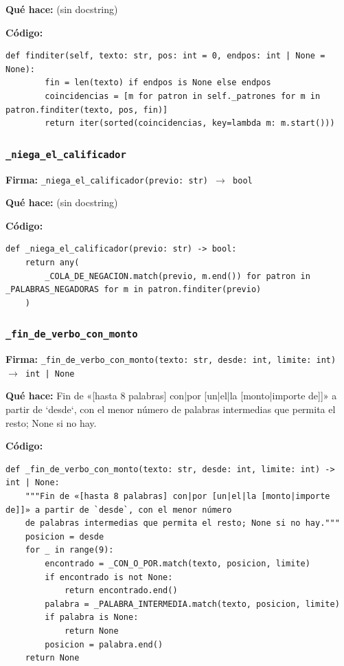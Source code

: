 \documentclass[11pt,a4paper]{article}
\begin{document}
\textbf{Qué hace:} (sin docstring)

\textbf{Código:}
\begin{lstlisting}
def finditer(self, texto: str, pos: int = 0, endpos: int | None = None):
        fin = len(texto) if endpos is None else endpos
        coincidencias = [m for patron in self._patrones for m in patron.finditer(texto, pos, fin)]
        return iter(sorted(coincidencias, key=lambda m: m.start()))
\end{lstlisting}

\subsubsection*{\texttt{\_niega\_el\_calificador}}
\textbf{Firma:} \texttt{\_niega\_el\_calificador(previo: str) $\rightarrow$ bool}

\textbf{Qué hace:} (sin docstring)

\textbf{Código:}
\begin{lstlisting}
def _niega_el_calificador(previo: str) -> bool:
    return any(
        _COLA_DE_NEGACION.match(previo, m.end()) for patron in _PALABRAS_NEGADORAS for m in patron.finditer(previo)
    )
\end{lstlisting}

\subsubsection*{\texttt{\_fin\_de\_verbo\_con\_monto}}
\textbf{Firma:} \texttt{\_fin\_de\_verbo\_con\_monto(texto: str, desde: int, limite: int) $\rightarrow$ int | None}

\textbf{Qué hace:} Fin de «[hasta 8 palabras] con|por [un|el|la [monto|importe de]]» a partir de `desde`, con el menor número
de palabras intermedias que permita el resto; None si no hay.

\textbf{Código:}
\begin{lstlisting}
def _fin_de_verbo_con_monto(texto: str, desde: int, limite: int) -> int | None:
    """Fin de «[hasta 8 palabras] con|por [un|el|la [monto|importe de]]» a partir de `desde`, con el menor número
    de palabras intermedias que permita el resto; None si no hay."""
    posicion = desde
    for _ in range(9):
        encontrado = _CON_O_POR.match(texto, posicion, limite)
        if encontrado is not None:
            return encontrado.end()
        palabra = _PALABRA_INTERMEDIA.match(texto, posicion, limite)
        if palabra is None:
            return None
        posicion = palabra.end()
    return None
\end{lstlisting}
\end{document}
